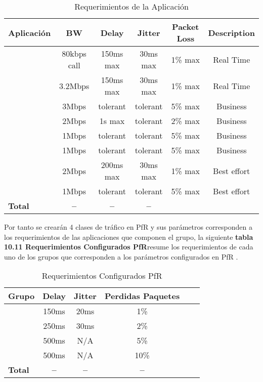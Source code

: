 \begin{table}[ht]
	\caption{Requerimientos de la Aplicación}
	\label{tab:hla:results}
\centering
\begin{tabular}{lccccc}
	\toprule
	\multicolumn{1}{c}{\textbf{Aplicación}} 	& \textbf{BW}	& \textbf{Delay}	& \textbf{Jitter} 	& \textbf{Packet Loss} & \textbf{Description}\\
	\midrule
\cite{Telefonia} 		& 80kbps call & 150ms max & 30ms max	& 1\% max & Real Time\\
\cite{Videoconferencia} & 3.2Mbps & 150ms max & 30ms max & 1\% max & Real Time\\
\cite{FTP} 		& 3Mbps & tolerant & tolerant& 5\% max & Business\\
\cite{CCTV} 		& 2Mbps & 1s max & tolerant	& 2\% max & Business\\
\cite{Web Privada} 		& 1Mbps & tolerant & tolerant & 5\% max & Business\\
\cite{Internet} 		& 1Mbps & tolerant & tolerant & 5\% max & Business\\
\cite{Escritorio remoto} & 2Mbps & 200ms max & 30ms max	& 1\% max & Best effort\\
\cite{Correo} & 1Mbps & tolerant & tolerant	& 5\% max & Best effort\\
	\midrule
	\textbf{Total}			& \textbf{--}		& \textbf{--}		& \textbf{--} \\
	\bottomrule
\end{tabular}
\end{table}
Por tanto se crearán 4 clases de tráfico en PfR y sus parámetros corresponden a los requerimientos de las aplicaciones que componen el grupo, la siguiente \textbf{tabla 10.11 Requerimientos Configurados PfR}resume los requerimientos de cada uno de los grupos que corresponden a los parámetros configurados en PfR .
\begin{table}[ht]
	\caption{Requerimientos Configurados PfR}
	\label{tab:hla:results}
\centering
\begin{tabular}{lccccc}
	\toprule
\multicolumn{1}{c}{\textbf{Grupo}} 	& \textbf{Delay}	& \textbf{Jitter}	& \textbf{Perdidas Paquetes}\\
	\midrule
\cite{Real-Time} 		& 150ms & 20ms & 1\% \\
\cite{Business-class} 		& 250ms & 30ms & 2\% \\
\cite{Best Effort} 		& 500ms & N/A & 5\% \\
\cite{Scavenger} 		& 500ms & N/A & 10\% \\
	\midrule
	\textbf{Total}			& \textbf{--}		& \textbf{--}		& \textbf{--} \\
	\bottomrule
\end{tabular}
\end{table}

